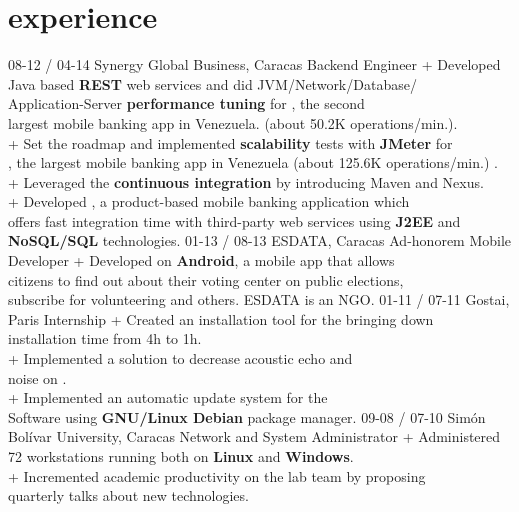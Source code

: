 \documentclass[]{friggeri-cv}
\begin{document}
\section{experience}

\begin{entrylist}
  \entry
    {\small 08-12 / 04-14}
    {Synergy Global Business, Caracas}
    {Backend Engineer}
    {+ Developed Java based \textbf{REST} web services and did JVM/Network/Database/\\
        Application-Server \textbf{performance tuning} for , the second\\
        largest mobile banking app in Venezuela. (about 50.2K operations/min.).\\
     + Set the roadmap and implemented \textbf{scalability} tests with \textbf{JMeter} for\\
         , the largest mobile banking app in Venezuela (about 125.6K operations/min.) .\\
     + Leveraged the \textbf{continuous integration} by introducing Maven and Nexus.\\
     + Developed , a product-based mobile banking application which\\ 
        offers fast integration time with third-party web services using \textbf{J2EE} and\\
        \textbf{NoSQL/SQL} technologies.}
  \entry
    {\small 01-13 / 08-13}
    {ESDATA, Caracas}
    {Ad-honorem Mobile Developer}
    {+ Developed  on \textbf{Android}, a mobile app that allows\\
         citizens to ﬁnd out about their voting center on public elections,\\
         subscribe for volunteering and others. ESDATA is an NGO.}
  \entry
    {\small 01-11 / 07-11}
    {Gostai, Paris}
    {Internship}
    {+ Created an installation tool for the  bringing down\\
          installation time from 4h to 1h.\\
      + Implemented a solution to decrease acoustic echo and\\
          noise on .\\
      + Implemented an automatic update system for the\\
           Software using \textbf{GNU/Linux Debian} package manager.}
  \entry
    {\small 09-08 / 07-10}
    {Simón Bolívar University, Caracas}
    {Network and System Administrator}
    {+ Administered 72 workstations running both on \textbf{Linux} and \textbf{Windows}.\\
     + Incremented academic productivity on the lab team by proposing\\
         quarterly talks about new technologies.}
\end{entrylist}
\end{document}

